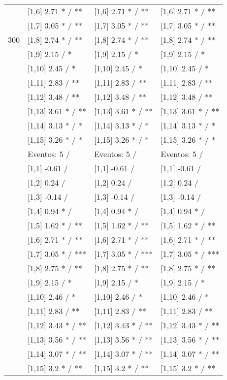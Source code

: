 \begin{table}
\begin{tabular}[t]{llll}
 & {}[1,6] 2.71 * / ** & {}[1,6] 2.71 * / ** & {}[1,6] 2.71 * / **\\
 & {}[1,7] 3.05 * / ** & {}[1,7] 3.05 * / ** & {}[1,7] 3.05 * / **\\
300 & {}[1,8] 2.74 * / ** & {}[1,8] 2.74 * / ** & {}[1,8] 2.74 * / **\\
\addlinespace
 & {}[1,9] 2.15  / * & {}[1,9] 2.15  / * & {}[1,9] 2.15  / *\\
 & {}[1,10] 2.45  / * & {}[1,10] 2.45  / * & {}[1,10] 2.45  / *\\
 & {}[1,11] 2.83  / ** & {}[1,11] 2.83  / ** & {}[1,11] 2.83  / **\\
 & {}[1,12] 3.48  / ** & {}[1,12] 3.48  / ** & {}[1,12] 3.48  / **\\
 & {}[1,13] 3.61 * / ** & {}[1,13] 3.61 * / ** & {}[1,13] 3.61 * / **\\
\addlinespace
 & {}[1,14] 3.13 * / * & {}[1,14] 3.13 * / * & {}[1,14] 3.13 * / *\\
 & {}[1,15] 3.26 * / * & {}[1,15] 3.26 * / * & {}[1,15] 3.26 * / *\\
 & Eventos:  5 / & Eventos:  5 / & Eventos:  5 /\\
 & {}[1,1] -0.61  / & {}[1,1] -0.61  / & {}[1,1] -0.61  /\\
 & {}[1,2] 0.24  / & {}[1,2] 0.24  / & {}[1,2] 0.24  /\\
\addlinespace
 & {}[1,3] -0.14  / & {}[1,3] -0.14  / & {}[1,3] -0.14  /\\
 & {}[1,4] 0.94 * / & {}[1,4] 0.94 * / & {}[1,4] 0.94 * /\\
 & {}[1,5] 1.62 * / ** & {}[1,5] 1.62 * / ** & {}[1,5] 1.62 * / **\\
 & {}[1,6] 2.71 * / ** & {}[1,6] 2.71 * / ** & {}[1,6] 2.71 * / **\\
 & {}[1,7] 3.05 * / *** & {}[1,7] 3.05 * / *** & {}[1,7] 3.05 * / ***\\
\addlinespace
500 & {}[1,8] 2.75 * / ** & {}[1,8] 2.75 * / ** & {}[1,8] 2.75 * / **\\
 & {}[1,9] 2.15  / * & {}[1,9] 2.15  / * & {}[1,9] 2.15  / *\\
 & {}[1,10] 2.46  / * & {}[1,10] 2.46  / * & {}[1,10] 2.46  / *\\
 & {}[1,11] 2.83  / ** & {}[1,11] 2.83  / ** & {}[1,11] 2.83  / **\\
 & {}[1,12] 3.43 * / ** & {}[1,12] 3.43 * / ** & {}[1,12] 3.43 * / **\\
\addlinespace
 & {}[1,13] 3.56 * / ** & {}[1,13] 3.56 * / ** & {}[1,13] 3.56 * / **\\
 & {}[1,14] 3.07 * / ** & {}[1,14] 3.07 * / ** & {}[1,14] 3.07 * / **\\
 & {}[1,15] 3.2 * / ** & {}[1,15] 3.2 * / ** & {}[1,15] 3.2 * / **\\
\bottomrule
\end{tabular}
\end{table}

